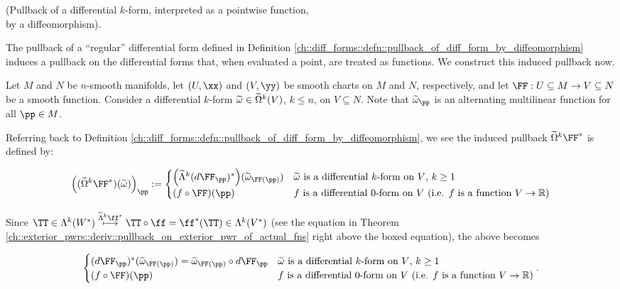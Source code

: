 \begin{deriv}
\label{ch::diff_forms::deriv::pullback_of_diff_form_actual_fn_by_diffeomorphism}
    (Pullback of a differential $k$-form, interpreted as a pointwise function, \\ by a diffeomorphism).
    
    The pullback of a ``regular'' differential form defined in Definition \ref{ch::diff_forms::defn::pullback_of_diff_form_by_diffeomorphism} induces a pullback on the differential forms that, when evaluated a point, are treated as functions. We construct this induced pullback now.
    
    Let $M$ and $N$ be $n$-smooth manifolds, let $(U, \xx)$ and $(V, \yy)$ be smooth charts on $M$ and $N$, respectively, and let $\FF:U \subseteq M \rightarrow V \subseteq N$ be a smooth function. Consider a differential $k$-form $\widetilde{\omega} \in \widetilde{\Omega}^k(V)$, $k \leq n$, on $V \subseteq N$. Note that $\tomega_\pp$ is an alternating multilinear function for all $\pp \in M$.
    
    Referring back to Definition \ref{ch::diff_forms::defn::pullback_of_diff_form_by_diffeomorphism}, we see the induced pullback $\tOmega^k \FF^*$ is defined by:
    
    \begin{align*}
        \Big( (\tOmega^k \FF^*)(\tomega) \Big)_\pp :=
        \begin{cases}
            \Big( \tLambda^k (d\FF_\pp)^* \Big)(\tomega_{\FF(\pp)}) & \text{$\tomega$ is a differential $k$-form on $V$, $k \geq 1$} \\
            (f \circ \FF)(\pp) & \text{$f$ is a differential $0$-form on $V$ (i.e. $f$ is a function $V \rightarrow \R$)}
        \end{cases}
    \end{align*}
    
    Since $\TT \in \Lambda^k(W^*) \overset{\tLambda^k \ff^*}{\longmapsto} \TT \circ \ff = \ff^*(\TT) \in \Lambda^k(V^*)$ (see the equation in Theorem \ref{ch::exterior_pwrs::deriv::pullback_on_exterior_pwr_of_actual_fns} right above the boxed equation), the above becomes
    
    \begin{align*}
        \begin{cases}
            (d\FF_\pp)^*(\tomega_{\FF(\pp)}) = \tomega_{\FF(\pp)} \circ d\FF_\pp & \text{$\tomega$ is a differential $k$-form on $V$, $k \geq 1$} \\
            (f \circ \FF)(\pp) & \text{$f$ is a differential $0$-form on $V$ (i.e. $f$ is a function $V \rightarrow \R$)}
        \end{cases}.
    \end{align*}
    

\end{deriv}
